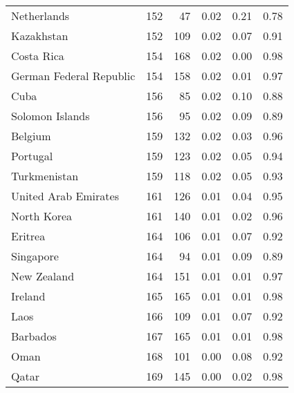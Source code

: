 \begin{longtable}[t]{lrrrrr}
\addlinespace
Netherlands & 152 & 47 & 0.02 & 0.21 & 0.78\\
Kazakhstan & 152 & 109 & 0.02 & 0.07 & 0.91\\
Costa Rica & 154 & 168 & 0.02 & 0.00 & 0.98\\
German Federal Republic & 154 & 158 & 0.02 & 0.01 & 0.97\\
Cuba & 156 & 85 & 0.02 & 0.10 & 0.88\\
\addlinespace
Solomon Islands & 156 & 95 & 0.02 & 0.09 & 0.89\\
Belgium & 159 & 132 & 0.02 & 0.03 & 0.96\\
Portugal & 159 & 123 & 0.02 & 0.05 & 0.94\\
Turkmenistan & 159 & 118 & 0.02 & 0.05 & 0.93\\
United Arab Emirates & 161 & 126 & 0.01 & 0.04 & 0.95\\
\addlinespace
North Korea & 161 & 140 & 0.01 & 0.02 & 0.96\\
Eritrea & 164 & 106 & 0.01 & 0.07 & 0.92\\
Singapore & 164 & 94 & 0.01 & 0.09 & 0.89\\
New Zealand & 164 & 151 & 0.01 & 0.01 & 0.97\\
Ireland & 165 & 165 & 0.01 & 0.01 & 0.98\\
\addlinespace
Laos & 166 & 109 & 0.01 & 0.07 & 0.92\\
Barbados & 167 & 165 & 0.01 & 0.01 & 0.98\\
Oman & 168 & 101 & 0.00 & 0.08 & 0.92\\
Qatar & 169 & 145 & 0.00 & 0.02 & 0.98\\
\bottomrule
\end{longtable}
